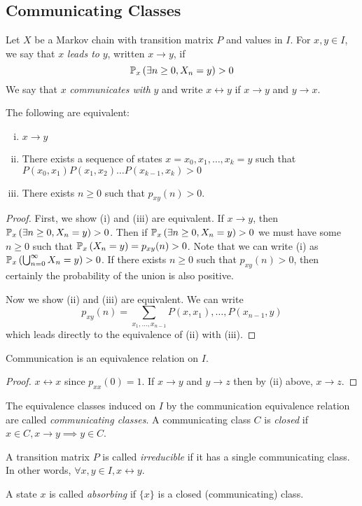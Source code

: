 \subsection{Communicating Classes}
\begin{definition}
	Let \( X \) be a Markov chain with transition matrix \( P \) and values in \( I \).
	For \( x, y \in I \), we say that \( x \) \textit{leads to} \( y \), written \( x \to y \), if
	\[
		\mathbb{P}_{x}\left({\exists n \geq 0, X_n = y}\right) > 0
	\]
	We say that \( x \) \textit{communicates with} \( y \) and write \( x \leftrightarrow y \) if \( x \to y \) and \( y \to x \).
\end{definition}
\begin{theorem}
	The following are equivalent:
	\begin{enumerate}[(i)]
		\item \( x \to y \)
		\item There exists a sequence of states \( x = x_0, x_1, \dots, x_k = y \) such that \( P(x_0, x_1)P(x_1,x_2)\dots P(x_{k-1},x_k) > 0 \)
		\item There exists \( n \geq 0 \) such that \( p_{xy}(n) > 0 \).
	\end{enumerate}
\end{theorem}
\begin{proof}
	First, we show (i) and (iii) are equivalent.
	If \( x \to y \), then \( \mathbb{P}_{x}\left({\exists n \geq 0, X_n = y}\right) > 0 \).
	Then if \( \mathbb{P}_{x}\left({\exists n \geq 0, X_n = y}\right) > 0 \) we must have some \( n \geq 0 \) such that \( \mathbb{P}_{x}\left({X_n = y}\right) = p_{xy}(n) > 0 \).
	Note that we can write (i) as \( \mathbb{P}_{x}\left({\bigcup_{n=0}^\infty X_n = y}\right) > 0 \).
	If there exists \( n \geq 0 \) such that \( p_{xy}(n) > 0 \), then certainly the probability of the union is also positive.

	Now we show (ii) and (iii) are equivalent.
	We can write
	\[
		p_{xy}(n) = \sum_{x_1, \dots, x_{n-1}} P(x, x_1), \dots, P(x_{n-1}, y)
	\]
	which leads directly to the equivalence of (ii) with (iii).
\end{proof}
\begin{corollary}
	Communication is an equivalence relation on \( I \).
\end{corollary}
\begin{proof}
	\( x \leftrightarrow x \) since \( p_{xx}(0) = 1 \).
	If \( x \to y \) and \( y \to z \) then by (ii) above, \( x \to z \).
\end{proof}
\begin{definition}
	The equivalence classes induced on \( I \) by the communication equivalence relation are called \textit{communicating classes}.
	A communicating class \( C \) is \textit{closed} if \( x \in C, x \to y \implies y \in C \).
\end{definition}
\begin{definition}
	A transition matrix \( P \) is called \textit{irreducible} if it has a single communicating class.
	In other words, \( \forall x, y \in I, x \leftrightarrow y \).
\end{definition}
\begin{definition}
	A state \( x \) is called \textit{absorbing} if \( \{ x \} \) is a closed (communicating) class.
\end{definition}

